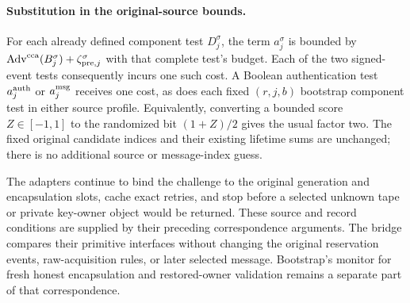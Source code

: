 \paragraph{Substitution in the original-source bounds.}
For each already defined component test $D_j^\sigma$, the term
$a_j^\sigma$ is bounded by
$\operatorname{Adv}^{\rm cca}(B_j^\sigma)
 +\zeta_{{\rm pre},j}^{\sigma}$ with that complete test's budget.
Each of the two signed-event tests consequently incurs one such cost.
A Boolean authentication test $a_j^{\rm auth}$ or $a_j^{\rm msg}$
receives one cost, as does each fixed $(r,j,b)$ bootstrap component test
in either source profile. Equivalently, converting a bounded score
$Z\in[-1,1]$ to the randomized bit $(1+Z)/2$ gives the usual factor two.
The fixed original candidate indices and their existing lifetime sums
are unchanged; there is no additional source or message-index guess.

The adapters continue to bind the challenge to the original generation
and encapsulation slots, cache exact retries, and stop before a selected
unknown tape or private key-owner object would be returned. These source and record
conditions are supplied by their preceding correspondence arguments.
The bridge compares their primitive interfaces without changing the
original reservation events, raw-acquisition rules, or later selected
message. Bootstrap's monitor for fresh honest encapsulation and
restored-owner validation remains a separate part of that correspondence.
